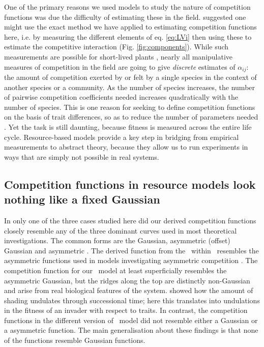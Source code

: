 \documentclass[a4paper,11pt]{article}
\begin{document}
One of the primary reasons we used models to study the nature of competition functions was due the difficulty of estimating these in the field. \citet{Ricklefs-1973} suggested one might use the exact method we have applied to estimating competition functions here, i.e. by measuring the different elements of eq. \ref{eq:LVi} then using these to estimate the competitive interaction (Fig. \ref{fig:components}).
While such measurements are possible for short-lived plants \citep{Kraft-2015}, nearly all manipulative measures of competition in the field are going to give \emph{discrete} estimates of $\alpha_{ij}$: the amount of competition exerted by or felt by a single species in the context of another species or a community. As the number of species increases, the number of pairwise competition coefficients needed increases quadratically with the number of species. This is one reason for seeking to define competition functions on the basis of trait differences, so as to reduce the number of parameters needed \citep{Kraft-2015}. 
Yet the task is still daunting, because fitness is measured across the entire life cycle.
Resource-based models provide a key step in bridging from empirical measurements to abstract theory, because they allow us to run experiments in ways that are simply not possible in real systems.

\subsection{Competition functions in resource models look nothing like a fixed Gaussian}

In only one of the three cases studied here did our derived competition functions closely resemble any of the three dominant curves used in most theoretical investigations. The common forms are the Gaussian, asymmetric (offset) Gaussian \citep{Roughgarden-1979}
and asymmetric \citep[e.g.][]{Kisdi-1999, Law-1997}.
The derived function from the \hmat\ within \plant\
resembles the asymmetric functions used in models investigating asymmetric competition \citep{Law-1997, Geritz-1999, Kisdi-1999,
  Calcagno-2006}. The competition function for our \lma\ model at least superficially resembles the asymmetric Gaussian, but the ridges along the top are distinctly non-Gaussian and arise from real biological features of the system. \citet{Falster-2011} showed how the amount of shading undulates through successional time; here this translates into undulations in the fitness of an invader with respect to traits. In contrast, the competition functions in the different version of \Rstar\ model did not resemble either a Gaussian or a asymmetric function. The main generalisation about these findings is that none of the functions resemble Gaussian functions.
\end{document}
